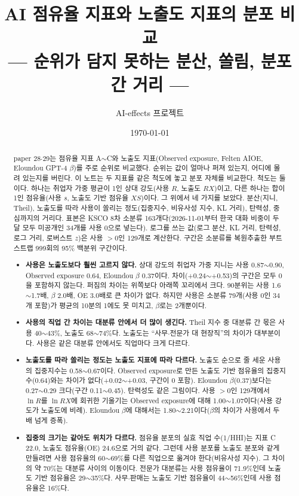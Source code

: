 \documentclass[11pt]{article}
\title{AI 점유율 지표와 노출도 지표의 분포 비교\\[2mm]
\large --- 순위가 담지 못하는 분산, 쏠림, 분포 간 거리 ---}
\author{AI-effects 프로젝트}
\date{\today}
\begin{document}
\maketitle

\begin{abstract}
\noindent paper 28$\cdot$29는 점유율 지표 A$\sim$C와 노출도 지표(Observed exposure, Felten AIOE, Eloundou GPT-4 $\beta$)를 주로 순위로 비교했다. 순위는 값이 얼마나 퍼져 있는지, 어디에 몰려 있는지를 버린다. 이 노트는 두 지표를 같은 척도에 놓고 분포 자체를 비교한다. 척도는 둘이다. 하나는 취업자 가중 평균이 1인 상대 강도(사용 $R$, 노출도 $RX$)이고, 다른 하나는 합이 1인 점유율(사용 $s$, 노출도 기반 점유율 $XS$)이다. 그 위에서 네 가지를 보았다. 분산(지니, Theil), 노출도를 따라 사용이 쏠리는 정도(집중지수, 비유사성 지수, KL 거리), 탄력성, 중심까지의 거리다. 표본은 KSCO 8차 소분류 163개다(2026-11-01부터 한국 대화 비중이 두 달 모두 미공개인 34개를 사용 0으로 넣는다). 로그를 쓰는 값(로그 분산, KL 거리, 탄력성, 로그 거리, 로버스트 $z$)은 사용 $> 0$인 129개로 계산한다. 구간은 소분류를 복원추출한 부트스트랩 999회의 95\% 백분위 구간이다.
\begin{itemize}[leftmargin=*]
  \item \textbf{사용은 노출도보다 훨씬 고르지 않다.} 상대 강도의 취업자 가중 지니는 사용 0.87$\sim$0.90, Observed exposure 0.64, Eloundou $\beta$ 0.37이다. 차이(+0.24$\sim$+0.53)의 구간은 모두 0을 포함하지 않는다. 퍼짐의 차이는 위쪽보다 아래쪽 꼬리에서 크다. 90분위는 사용 1.6$\sim$1.7배, $\beta$ 2.0배, OE 3.0배로 큰 차이가 없다. 하지만 사용은 소분류 79개(사용 0인 34개 포함)가 평균의 10분의 1에도 못 미치고, $\beta$로는 2개뿐이다.
  \item \textbf{사용의 직업 간 차이는 대분류 안에서 더 많이 생긴다.} Theil 지수 중 대분류 간 몫은 사용 40$\sim$43\%, 노출도 68$\sim$74\%다. 노출도는 ``사무$\cdot$전문가 대 현장직''의 차이가 대부분이다. 사용은 같은 대분류 안에서도 직업마다 크게 다르다.
  \item \textbf{노출도를 따라 쏠리는 정도는 노출도 지표에 따라 다르다.} 노출도 순으로 줄 세운 사용의 집중지수는 0.58$\sim$0.67이다. Observed exposure로 만든 노출도 기반 점유율의 집중지수(0.64)와는 차이가 없다(+0.02$\sim$+0.03, 구간이 0 포함). Eloundou $\beta$(0.37)보다는 0.27$\sim$0.29 크다(구간 0.11$\sim$0.45). 탄력성도 같은 그림이다. 사용 $> 0$인 129개에서 $\ln R$를 $\ln RX$에 회귀한 기울기는 Observed exposure에 대해 1.00$\sim$1.07이다(사용 강도가 노출도에 비례). Eloundou $\beta$에 대해서는 1.80$\sim$2.21이다($\beta$의 차이가 사용에서 두 배 넘게 증폭).
  \item \textbf{집중의 크기는 같아도 위치가 다르다.} 점유율 분포의 실효 직업 수(1/HHI)는 지표 C 22.0, 노출도 점유율(OE) 24.6으로 거의 같다. 그런데 사용 분포를 노출도 분포와 같게 만들려면 사용 점유율의 60$\sim$69\%를 다른 직업으로 옮겨야 한다(비유사성 지수). 그 차이의 약 70\%는 대분류 사이의 이동이다. 전문가 대분류는 사용 점유율이 71.9\%인데 노출도 기반 점유율은 29$\sim$35\%다. 사무$\cdot$판매는 노출도 기반 점유율이 44$\sim$56\%인데 사용 점유율은 16\%다.

\end{itemize}
\end{abstract}
\end{document}
